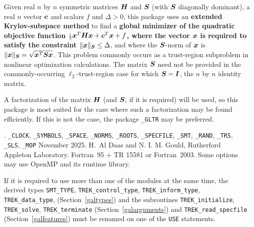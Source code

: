 \documentclass{galahad}
\newcommand{\packagename}{TREK}
\newcommand{\fullpackagename}{\libraryname\_\packagename}
\begin{document}
\galheader


\galsummary
Given real $n$ by $n$ symmetric matrices ${\bm{H}}$ and ${\bm{S}}$
(with ${\bm{S}}$ diagonally dominant),
a real $n$ vector ${\bm{c}}$ and scalars $f$ and $\Delta>0$, this package 
uses an {\bf extended Krylov-subspace method} to find a
{\bf global minimizer of the quadratic objective function
${\scriptstyle \frac{1}{2}} {\bm{x}}^T {\bm{H}} {\bm{x}}  +  {\bm{c}}^T {\bm{x}} + f$, where the vector ${\bm{x}}$ is
required to satisfy the constraint $\|{\bm{x}}\|_{{\bm{S}}} \leq  \Delta$}, and
where the ${\bm{S}}$-norm of ${\bm{x}}$ is $\|{\bm{x}}\|_{{\bm{S}}} = \sqrt{{\bm{x}}^T {\bm{S}} {\bm{x}}}$.
This problem commonly occurs as a trust-region subproblem in nonlinear
optimization calculations.
The matrix ${\bm{S}}$ need not be provided in the commonly-occurring
$\ell_2$-trust-region case for which ${\bm{S}} = {\bm{I}}$, the $n$ by $n$
identity matrix.

\noindent
A factorization of the matrix ${\bm{H}}$ (and ${\bm{S}}$, if it is required)
will be used, so this package is most suited
for the case where such a factorization may be found efficiently. If
this is not the case, the package {\tt \libraryname\_GLTR} may be preferred.


\galattributes
\galversions{\tt  \fullpackagename\_single, \fullpackagename\_double}.
\galuses
{\tt \libraryname\_CLOCK},
{\tt \libraryname\_SY\-M\-BOLS},
{\tt \libraryname\_SPACE}, {\tt \libraryname\_\-NORMS},
{\tt \libraryname\_ROOTS}, {\tt \libraryname\_SPECFILE},
{\tt \libraryname\_SMT}, {\tt \libraryname\_RAND}, 
{\tt \libraryname\_TRS}, {\tt \libraryname\_SLS}, 
{\tt \libraryname\_MOP}
\galdate November 2025.
\galorigin H.\ Al Daas and N. I. M. Gould, Rutherford Appleton Laboratory.
\gallanguage Fortran~95 + TR 15581 or Fortran~2003.
\galparallelism Some options may use OpenMP and its runtime library.


\galhowto



\noindent
If it is required to use more than one of the modules at the same time, 
the derived types
{\tt SMT\_TYPE},
{\tt \packagename\_control\_type},
{\tt \packagename\_inform\_type},
{\tt \packagename\_data\_type},
(Section~\ref{galtypes})
and the subroutines
{\tt \packagename\_initialize},
{\tt \packagename\_solve}, {\tt \packagename\_\-terminate}
(Section~\ref{galarguments})
and
{\tt \packagename\_read\_specfile}
(Section~\ref{galfeatures})
must be renamed on one of the {\tt USE} statements.
\end{document}
